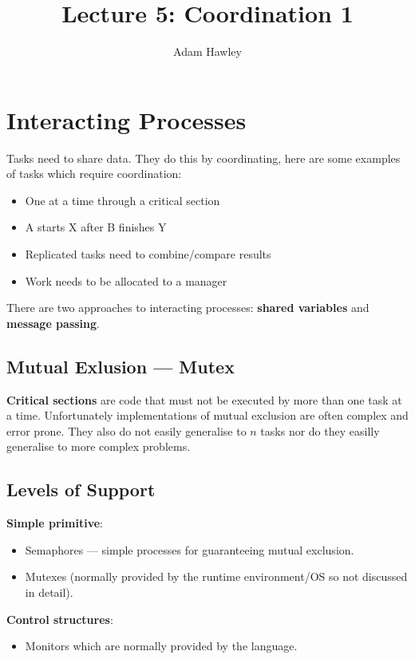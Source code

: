 \documentclass{article}
\title{Lecture 5: Coordination 1}
\author{Adam Hawley}
\begin{document}
\maketitle

\section{Interacting Processes}
Tasks need to share data.
They do this by coordinating, here are some examples of tasks which require coordination:
\begin{itemize}
	\item One at a time through a critical section
	\item A starts X after B finishes Y
	\item Replicated tasks need to combine/compare results
	\item Work needs to be allocated to a manager
\end{itemize}
There are two approaches to interacting processes: \textbf{shared variables} and \textbf{message passing}.

\subsection{Mutual Exlusion --- Mutex}
\textbf{Critical sections} are code that must not be executed by more than one task at a time.
Unfortunately implementations of mutual exclusion are often complex and error prone.
They also do not easily generalise to $n$ tasks nor do they easilly generalise to more complex problems.

\subsection{Levels of Support}
\textbf{Simple primitive}:
\begin{itemize}
	\item Semaphores --- simple processes for guaranteeing mutual exclusion.
	\item Mutexes (normally provided by the runtime environment/OS so not discussed in detail).
\end{itemize}
\textbf{Control structures}:
\begin{itemize}
	\item Monitors which are normally provided by the language.
\end{itemize}
\end{document}
